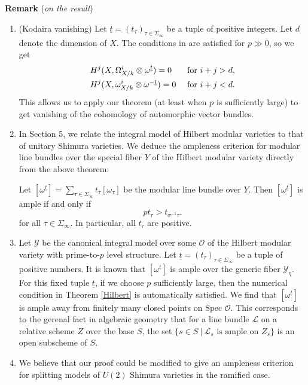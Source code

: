 \documentclass{article}
\begin{document}
\medskip
\noindent
\textbf{Remark} (\emph{on the result})
\begin{enumerate}
	\item (Kodaira vanishing) Let $\underline{t}=(t_\tau)_{\tau\in\Sigma_{\infty}}$ be a tuple of positive integers. Let $d$ denote the dimension of $X$. The conditions in \citep[Corollary 2.8]{Deligne-Illusie} are satisfied for $p\gg0$, so we get
	\begin{equation}
		\begin{aligned}
			&H^j(X,\Omega_{X/k}^i\otimes \omega^{\underline{t}})=0 \  &\textnormal{for $i+j>d$},\\
			&H^j(X,\omega_{X/k}^i\otimes \omega^{-\underline{t}})=0 \  &\textnormal{for $i+j<d$}.
		\end{aligned}
	\end{equation}
	This allows us to apply our theorem (at least when $p$ is sufficiently large) to get vanishing of the cohomology of automorphic vector bundles.
	\item 	In Section 5, we relate the integral model of Hilbert modular varieties to that of unitary Shimura varieties. We deduce the ampleness criterion for modular line bundles over the special fiber $Y$ of the Hilbert modular variety directly from the above theorem:
	\begin{theorem}\label{Hilbert}
		Let $[\omega^{\underline{t}}]=\sum\limits_{\tau\in\Sigma_\infty}t_\tau[\omega_\tau]$ be the modular line bundle over $Y$. Then $[\omega^{\underline{t}}]$ is ample if and only if
		\begin{equation}
			pt_\tau> t_{\sigma^{-1}\tau}.
		\end{equation}
		for all $\tau\in \Sigma_{\infty}$. In particular, all $t_\tau$ are positive.	
	\end{theorem}
	\item Let $\mathcal{Y}$ be the canonical integral model over some $\mathcal{O}$ of the Hilbert modular variety with prime-to-$p$ level structure. Let $\underline{t}=(t_\tau)_{\tau\in\Sigma_{\infty}}$ be a tuple of positive numbers. It is known that $[\omega^{\underline{t}}]$ is ample over the generic fiber $\mathcal{Y}_\eta$. For this fixed tuple $\underline{t}$, if we choose $p$ sufficiently large, then the numerical condition in Theorem \ref{Hilbert} is automatically satisfied. We find that $[\omega^{\underline{t}}]$ is ample away from finitely many closed points on $\text{Spec } \mathcal{O}$. This corresponds to the gerenal fact in algebraic geometry that for a line bundle $\mathcal{L}$ on a relative scheme $Z$ over the base $S$, the set $\{s\in S\ |\ \mathcal{L}_s \text{ is ample on } Z_s\}$ is an open subscheme of $S$.
	\item We believe that our proof could be modified to give an ampleness criterion for splitting models of $U(2)$ Shimura varieties in the ramified case.
\end{enumerate}
\end{document}
